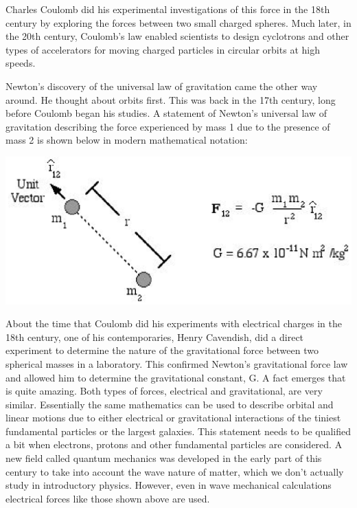 Charles Coulomb did his experimental investigations of this force in the 18th
century by exploring the forces between two small charged spheres. Much later,
in the 20th century, Coulomb's law enabled scientists to design cyclotrons and
other types of accelerators for moving charged particles in circular orbits
at high speeds. 

Newton's discovery of the universal law of gravitation came the other way around.
He thought about orbits first. This was back in the 17th century, long before
Coulomb began his studies. A statement of Newton's universal law of gravitation
describing the force experienced by mass 1 due to the presence of mass 2 is
shown below in modern mathematical notation: 

\vspace{0.3cm}
{\par\centering \includegraphics{elec_grav/elec_grav_fig4.eps} \par}
\vspace{0.3cm}

About the time that Coulomb did his experiments with electrical charges in the
18th century, one of his contemporaries, Henry Cavendish, did a direct experiment
to determine the nature of the gravitational force between two spherical masses
in a laboratory. This confirmed Newton's gravitational force law and allowed
him to determine the gravitational constant, G. A fact emerges that is quite
amazing. Both types of forces, electrical and gravitational, are very similar.
Essentially the same mathematics can be used to describe orbital and linear
motions due to either electrical or gravitational interactions of the tiniest
fundamental particles or the largest galaxies. This statement needs to be qualified
a bit when electrons, protons and other fundamental particles are considered.
A new field called quantum mechanics was developed in the early part of this
century to take into account the wave nature of matter, which we don't actually
study in introductory physics. However, even in wave mechanical calculations
electrical forces like those shown above are used. 

